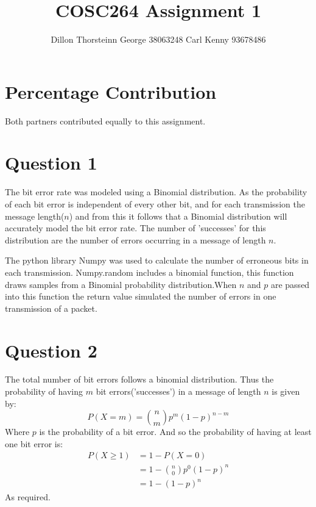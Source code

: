\documentclass{article}
\title{COSC264 Assignment 1}
\author{Dillon Thorsteinn George 38063248 Carl Kenny 93678486}
\date{}
\begin{document}
\maketitle{}
\null  %
\nointerlineskip  %
\vfill
\let\snewpage \newpage
\let\newpage \relax
\let \newpage \snewpage
\vfill 
\break %

\newpage

\section*{Percentage Contribution}
Both partners contributed equally to this assignment.

\section*{Question 1}
The bit error rate was modeled using a Binomial distribution. As the probability of each
bit error is independent of every other bit, and for each transmission the message length($n$)
and from this it follows that a Binomial distribution will accurately model the bit error rate.
The number of 'successes' for this distribution are the number of errors occurring in a message of
length $n$.

The python library Numpy was used to calculate the number of erroneous bits in each transmission.
Numpy.random includes a binomial function, this function draws samples from a Binomial probability
distribution.When $n$ and $p$ are passed into this function the return value simulated the number
of errors in one transmission of a packet.

\section*{Question 2}
The total number of bit errors follows a binomial distribution. Thus the probability of having $m$
bit errors('successes') in a message of length $n$ is given by:
\[
        P(X=m) = {n\choose m} p^m (1-p)^{n-m}
\]
Where $p$ is the probability of a bit error.
And so the probability of having at least one bit error is:
\begin{align*}
        P(X\geq 1) &= 1 - P(X = 0) \\
        &= 1 - {n\choose 0} p^0 (1-p)^{n} \\
                   &= 1 - (1 - p)^{n}
\end{align*}
As required.
\end{document}
